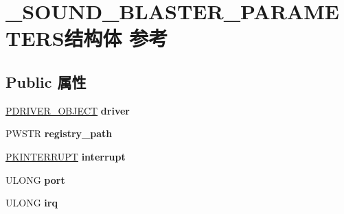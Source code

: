 \hypertarget{struct___s_o_u_n_d___b_l_a_s_t_e_r___p_a_r_a_m_e_t_e_r_s}{}\section{\+\_\+\+S\+O\+U\+N\+D\+\_\+\+B\+L\+A\+S\+T\+E\+R\+\_\+\+P\+A\+R\+A\+M\+E\+T\+E\+R\+S结构体 参考}
\label{struct___s_o_u_n_d___b_l_a_s_t_e_r___p_a_r_a_m_e_t_e_r_s}
\subsection*{Public 属性}
\begin{DoxyCompactItemize}
\item 
\mbox{\label{struct___s_o_u_n_d___b_l_a_s_t_e_r___p_a_r_a_m_e_t_e_r_s_a9ab0ef4f0a7caece1ca544789d252ed6}} 
\hyperlink{struct___d_r_i_v_e_r___o_b_j_e_c_t}{P\+D\+R\+I\+V\+E\+R\+\_\+\+O\+B\+J\+E\+CT} {\bfseries driver}
\item 
\mbox{\label{struct___s_o_u_n_d___b_l_a_s_t_e_r___p_a_r_a_m_e_t_e_r_s_a593ebd1868bbcc2c96f37d7dca63a303}} 
P\+W\+S\+TR {\bfseries registry\+\_\+path}
\item 
\mbox{\label{struct___s_o_u_n_d___b_l_a_s_t_e_r___p_a_r_a_m_e_t_e_r_s_a2fcc9302645fe651dce248aeb3e7014a}} 
\hyperlink{struct___k_i_n_t_e_r_r_u_p_t}{P\+K\+I\+N\+T\+E\+R\+R\+U\+PT} {\bfseries interrupt}
\item 
\mbox{\label{struct___s_o_u_n_d___b_l_a_s_t_e_r___p_a_r_a_m_e_t_e_r_s_a29027278bec977cb3a4a3f20bcc4813c}} 
U\+L\+O\+NG {\bfseries port}
\item 
\mbox{\label{struct___s_o_u_n_d___b_l_a_s_t_e_r___p_a_r_a_m_e_t_e_r_s_a5bf96a8f125f5a1aa543709d06d87ce0}} 
U\+L\+O\+NG {\bfseries irq}
\item 
\mbox{\label{struct___s_o_u_n_d___b_l_a_s_t_e_r___p_a_r_a_m_e_t_e_r_s_a5b853e63d615e232a86ef9d6916e334e}} 

\end{DoxyCompactItemize}
